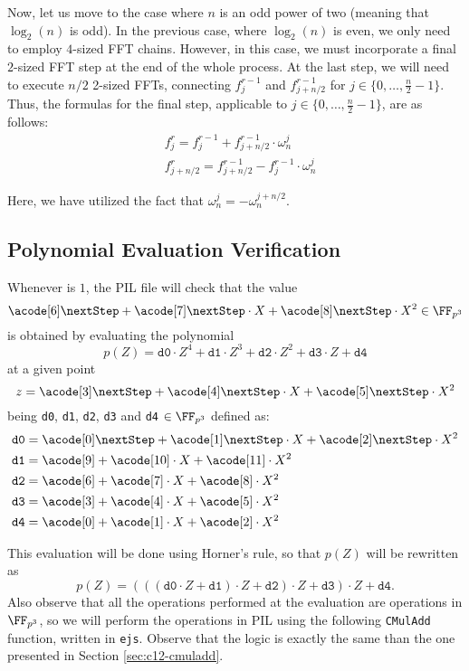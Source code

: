 Now, let us move to the case where $n$ is an odd power of two (meaning that $\log_2(n)$ is odd). In the previous case, where $\log_2(n)$ is even, we only need to employ $4$-sized FFT chains. However, in this case, we must incorporate a final $2$-sized FFT step at the end of the whole process. At the last step, we will need to execute $n/2$ 2-sized FFTs, connecting $f_j^{r-1}$ and $f_{j+n/2}^{r-1}$ for $j \in \{ 0, \ldots, \frac{n}{2}-1 \}$. Thus, the formulas for the final step, applicable to $j \in \{ 0, \ldots, \frac{n}{2}-1 \}$, are as follows:
\begin{align*}
&f_j^{r} = f_j^{r-1} + f_{j+n/2}^{r-1} \cdot \omega_{n}^j \\
&f_{j+n/2}^{r} = f_{j+n/2}^{r-1} - f_{j}^{r-1} \cdot \omega_{n}^j
\end{align*}

Here, we have utilized the fact that $\omega_{n}^j = -\omega_{n}^{j+n/2}$.







\subsection{Polynomial Evaluation Verification}

Whenever \EVPOL is $1$, the PIL file will check that the value 
\[
\acode[6] \nextStep + \acode[7] \nextStep \cdot X + \acode[8] \nextStep \cdot X^2 \in \FF_{p^3}
\]
is obtained by evaluating the polynomial
\[
p(Z) = \texttt{d0} \cdot Z^4 + \texttt{d1} \cdot Z^3 + \texttt{d2} \cdot Z^2 + \texttt{d3} \cdot Z + \texttt{d4}
\]
at a given point 
\[
z = \acode[3] \nextStep + \acode[4] \nextStep \cdot X + \acode[5] \nextStep \cdot X^2
\]
being \texttt{d0}, \texttt{d1}, \texttt{d2}, \texttt{d3} and \texttt{d4} $\in \FF_{p^3}$ defined as:
\begin{align*}
&\texttt{d0} = \acode[0] \nextStep + \acode[1] \nextStep \cdot X + \acode[2] \nextStep \cdot X^2 \\
&\texttt{d1} = \acode[9] + \acode[10] \cdot X + \acode[11] \cdot X^2 \\
&\texttt{d2} = \acode[6] + \acode[7] \cdot X + \acode[8] \cdot X^2   \\
&\texttt{d3} = \acode[3] + \acode[4] \cdot X + \acode[5] \cdot X^2   \\
&\texttt{d4} = \acode[0] + \acode[1] \cdot X + \acode[2] \cdot X^2
\end{align*}

This evaluation will be done using Horner's rule, so that $p(Z)$ will be rewritten as
\[
p(Z) = (((\texttt{d0} \cdot Z + \texttt{d1}) \cdot Z + \texttt{d2}) \cdot Z + \texttt{d3}) \cdot Z + \texttt{d4}.
\]
Also observe that all the operations performed at the evaluation are operations in $\FF_{p^3}$, so we will perform the operations in PIL using the following \texttt{CMulAdd} function, written in \texttt{ejs}. Observe that the logic is exactly the same than the one presented in Section \ref{sec:c12-cmuladd}.

